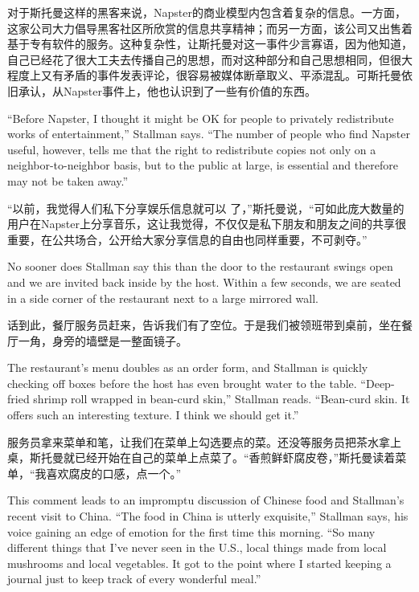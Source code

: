 \ifdefined\chs
对于斯托曼这样的黑客来说，Napster的商业模型内包含着复杂的信息。一方面，这家公司大力倡导黑客社区所欣赏的信息共享精神；而另一方面，该公司又出售着基于专有软件的服务。这种复杂性，让斯托曼对这一事件少言寡语，因为他知道，自己已经花了很大工夫去传播自己的思想，而对这种部分和自己思想相同，但很大程度上又有矛盾的事件发表评论，很容易被媒体断章取义、平添混乱。可斯托曼依旧承认，从Napster事件上，他也认识到了一些有价值的东西。
\fi

\ifdefined\eng
``Before Napster, I thought it might be \ifdefined\vone OK \fi\ifdefined\vtwo [sufficient] \fi for people to privately redistribute works of entertainment,'' Stallman says. ``The number of people who find Napster useful, however, tells me that the right to redistribute copies not only on a neighbor-to-neighbor basis, but to the public at large, is essential and therefore may not be taken away.''
\fi

\ifdefined\chs
``以前，我觉得人们私下分享娱乐信息就\ifdefined\vone 可以 \fi\ifdefined\vtwo [足够]\fi 了，''斯托曼说，``可如此庞大数量的用户在Napster上分享音乐，这让我觉得，不仅仅是私下朋友和朋友之间的共享很重要，在公共场合，公开给大家分享信息的自由也同样重要，不可剥夺。''
\fi

\ifdefined\eng
No sooner does Stallman say this than the door to the restaurant swings open and we are invited back inside by the host. Within a few seconds, we are seated in a side corner of the restaurant next to a large mirrored wall.
\fi

\ifdefined\chs
话到此，餐厅服务员赶来，告诉我们有了空位。于是我们被领班带到桌前，坐在餐厅一角，身旁的墙壁是一整面镜子。
\fi

\ifdefined\eng
The restaurant's menu doubles as an order form, and Stallman is quickly checking off boxes before the host has even brought water to the table. ``Deep-fried shrimp roll wrapped in bean-curd skin,'' Stallman reads. ``Bean-curd skin. It offers such an interesting texture. I think we should get it.''
\fi

\ifdefined\chs
服务员拿来菜单和笔，让我们在菜单上勾选要点的菜。还没等服务员把茶水拿上桌，斯托曼就已经开始在自己的菜单上点菜了。``香煎鲜虾腐皮卷，''斯托曼读着菜单，``我喜欢腐皮的口感，点一个。''
\fi

\ifdefined\eng
This comment leads to an impromptu discussion of Chinese food and Stallman's recent visit to China. ``The food in China is utterly exquisite,'' Stallman says, his voice gaining an edge of emotion for the first time this morning. ``So many different things that I've never seen in the U.S., local things made from local mushrooms and local vegetables. It got to the point where I started keeping a journal just to keep track of every wonderful meal.''
\fi

